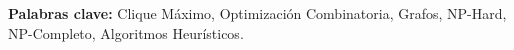 \begin{keywords}
\noindent \textbf{Palabras clave:} Clique Máximo, Optimización Combinatoria, Grafos, NP-Hard, NP-Completo, Algoritmos Heurísticos.
\end{keywords}